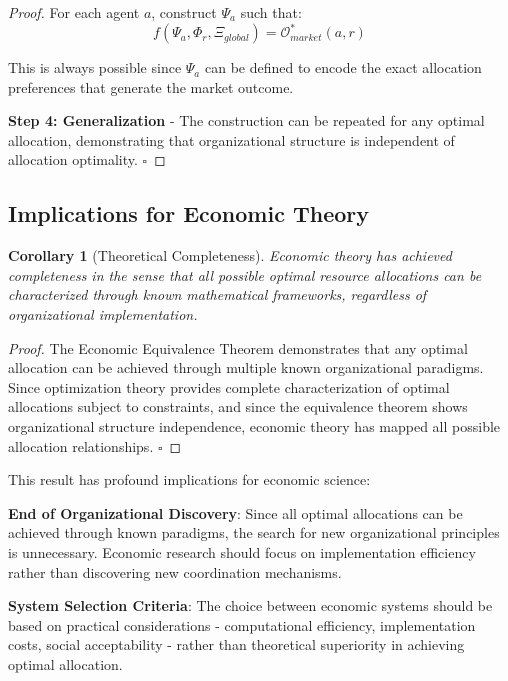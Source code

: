 \documentclass[12pt,a4paper]{article}
\newtheorem{corollary}[theorem]{Corollary}
\begin{document}
\begin{proof}
For each agent $a$, construct $\Psi_a$ such that:
\begin{equation}
f(\Psi_a, \Phi_r, \Xi_{global}) = \mathcal{O}^*_{market}(a,r)
\end{equation}

This is always possible since $\Psi_a$ can be defined to encode the exact allocation preferences that generate the market outcome.

\textbf{Step 4: Generalization} - The construction can be repeated for any optimal allocation, demonstrating that organizational structure is independent of allocation optimality. $\square$
\end{proof}

\subsection{Implications for Economic Theory}

\begin{corollary}[Theoretical Completeness]
Economic theory has achieved completeness in the sense that all possible optimal resource allocations can be characterized through known mathematical frameworks, regardless of organizational implementation.
\end{corollary}

\begin{proof}
The Economic Equivalence Theorem demonstrates that any optimal allocation can be achieved through multiple known organizational paradigms. Since optimization theory provides complete characterization of optimal allocations subject to constraints, and since the equivalence theorem shows organizational structure independence, economic theory has mapped all possible allocation relationships. $\square$
\end{proof}

This result has profound implications for economic science:

\textbf{End of Organizational Discovery}: Since all optimal allocations can be achieved through known paradigms, the search for new organizational principles is unnecessary. Economic research should focus on implementation efficiency rather than discovering new coordination mechanisms.

\textbf{System Selection Criteria}: The choice between economic systems should be based on practical considerations - computational efficiency, implementation costs, social acceptability - rather than theoretical superiority in achieving optimal allocation.
\end{document}
